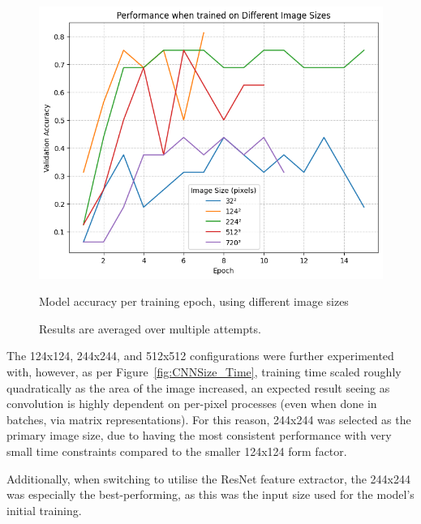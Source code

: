                         \begin{figure}[h]
                            \centering
                            \includegraphics[width=\textwidth]{images/CNNSize_Perf.png}
                            \caption{Model accuracy per training epoch, using different image sizes}
                            \label{fig:CNNSize_Perf}
                            \caption*{Results are averaged over multiple attempts.}
                        \end{figure}
    
                        The 124x124, 244x244, and 512x512 configurations were further experimented with, however, as per Figure~\ref{fig:CNNSize_Time}, training time scaled roughly quadratically as the area of the image increased, an expected result seeing as convolution is highly dependent on per-pixel processes (even when done in batches, via matrix representations). For this reason, 244x244 was selected as the primary image size, due to having the most consistent performance with very small time constraints compared to the smaller 124x124 form factor.
    
                        Additionally, when switching to utilise the ResNet feature extractor, the 244x244 was especially the best-performing, as this was the input size used for the model's initial training.
                
